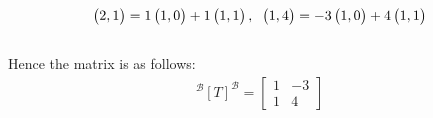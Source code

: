 \documentclass[reqno,a4paper,12pt]{amsart}
\newcommand{\B}{\mathscr{B}}
\numberwithin{equation}{section}
\begin{document}
  \begin{align}
    \begin{pmatrix}
      2 , 1 \\
    \end{pmatrix}
    =
    1
    \begin{pmatrix}
    1,0
    \end{pmatrix}
    +
    1
    \begin{pmatrix}
    1,1
    \end{pmatrix},\hspace{0.2cm}
    \begin{pmatrix}
      1, 4 \\
    \end{pmatrix}
    = 
    -3
    \begin{pmatrix}
     1,0
    \end{pmatrix}
    +
    4
    \begin{pmatrix}
    1,1
    \end{pmatrix} \label{eq:1.7}
  \end{align}\\
Hence the matrix is as follows:
  \begin{align}
     ^\B[T]^\B 
     =
     \begin{bmatrix}
       1 & -3 \\
       1 & 4
     \end{bmatrix} \label{eq:1.8}
   \end{align}\\   
   
\end{document}
